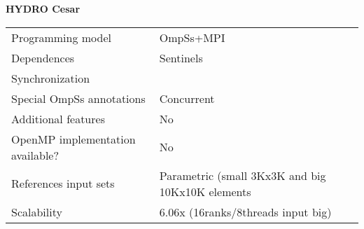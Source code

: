 
\section*{}
\label{hydro_cesar}

\centering
\Huge
\textbf{HYDRO Cesar}

\begin{table}[h!]
  \large
  \centering
  \begin{tabular}{|l|l|}
    \hline
    Programming model                &  OmpSs+MPI\\
    Dependences                      &  Sentinels\\
    Synchronization                  &  \\
    Special OmpSs annotations        &  Concurrent \\
    Additional features              &  No\\
    OpenMP implementation available? &  No\\
    References input sets            &  Parametric (small 3Kx3K and big 10Kx10K elements\\
    Scalability                      &  6.06x (16ranks/8threads input big)\\
    \hline
  \end{tabular}
\end{table}

\newpage
